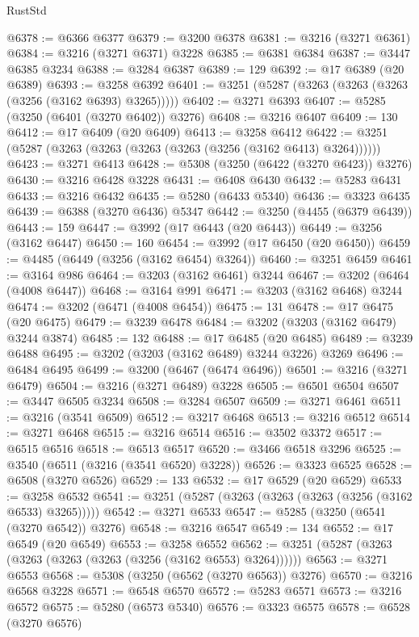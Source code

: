 \begin{lexlean}{RustStd}
\begin{coremodule}
@6378 := @6366 @6377
@6379 := @3200 @6378
@6381 := @3216 (@3271 @6361)
@6384 := @3216 (@3271 @6371) @3228
@6385 := @6381 @6384
@6387 := @3447 @6385 @3234
@6388 := @3284 @6387
@6389 := 129
@6392 := @17 @6389 (@20 @6389)
@6393 := @3258 @6392
@6401 := @3251 (@5287 (@3263 (@3263 (@3263 (@3256 (@3162 @6393) @3265)))))
@6402 := @3271 @6393
@6407 := @5285 (@3250 (@6401 (@3270 @6402)) @3276)
@6408 := @3216 @6407
@6409 := 130
@6412 := @17 @6409 (@20 @6409)
@6413 := @3258 @6412
@6422 := @3251 (@5287 (@3263 (@3263 (@3263 (@3263 (@3256 (@3162 @6413) @3264))))))
@6423 := @3271 @6413
@6428 := @5308 (@3250 (@6422 (@3270 @6423)) @3276)
@6430 := @3216 @6428 @3228
@6431 := @6408 @6430
@6432 := @5283 @6431
@6433 := @3216 @6432
@6435 := @5280 (@6433 @5340)
@6436 := @3323 @6435
@6439 := @6388 (@3270 @6436) @5347
@6442 := @3250 (@4455 (@6379 @6439))
@6443 := 159
@6447 := @3992 (@17 @6443 (@20 @6443))
@6449 := @3256 (@3162 @6447)
@6450 := 160
@6454 := @3992 (@17 @6450 (@20 @6450))
@6459 := @4485 (@6449 (@3256 (@3162 @6454) @3264))
@6460 := @3251 @6459
@6461 := @3164 @986
@6464 := @3203 (@3162 @6461) @3244
@6467 := @3202 (@6464 (@4008 @6447))
@6468 := @3164 @991
@6471 := @3203 (@3162 @6468) @3244
@6474 := @3202 (@6471 (@4008 @6454))
@6475 := 131
@6478 := @17 @6475 (@20 @6475)
@6479 := @3239 @6478
@6484 := @3202 (@3203 (@3162 @6479) @3244 @3874)
@6485 := 132
@6488 := @17 @6485 (@20 @6485)
@6489 := @3239 @6488
@6495 := @3202 (@3203 (@3162 @6489) @3244 @3226) @3269
@6496 := @6484 @6495
@6499 := @3200 (@6467 (@6474 @6496))
@6501 := @3216 (@3271 @6479)
@6504 := @3216 (@3271 @6489) @3228
@6505 := @6501 @6504
@6507 := @3447 @6505 @3234
@6508 := @3284 @6507
@6509 := @3271 @6461
@6511 := @3216 (@3541 @6509)
@6512 := @3217 @6468
@6513 := @3216 @6512
@6514 := @3271 @6468
@6515 := @3216 @6514
@6516 := @3502 @3372
@6517 := @6515 @6516
@6518 := @6513 @6517
@6520 := @3466 @6518 @3296
@6525 := @3540 (@6511 (@3216 (@3541 @6520) @3228))
@6526 := @3323 @6525
@6528 := @6508 (@3270 @6526)
@6529 := 133
@6532 := @17 @6529 (@20 @6529)
@6533 := @3258 @6532
@6541 := @3251 (@5287 (@3263 (@3263 (@3263 (@3256 (@3162 @6533) @3265)))))
@6542 := @3271 @6533
@6547 := @5285 (@3250 (@6541 (@3270 @6542)) @3276)
@6548 := @3216 @6547
@6549 := 134
@6552 := @17 @6549 (@20 @6549)
@6553 := @3258 @6552
@6562 := @3251 (@5287 (@3263 (@3263 (@3263 (@3263 (@3256 (@3162 @6553) @3264))))))
@6563 := @3271 @6553
@6568 := @5308 (@3250 (@6562 (@3270 @6563)) @3276)
@6570 := @3216 @6568 @3228
@6571 := @6548 @6570
@6572 := @5283 @6571
@6573 := @3216 @6572
@6575 := @5280 (@6573 @5340)
@6576 := @3323 @6575
@6578 := @6528 (@3270 @6576)

\end{coremodule}
\end{lexlean}
